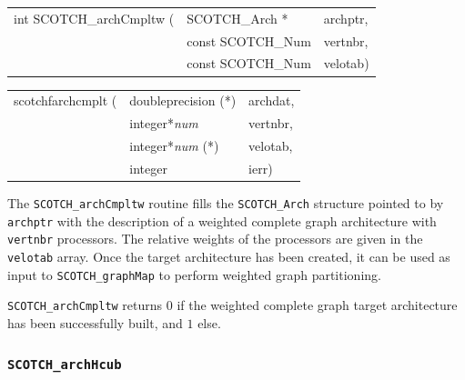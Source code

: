 \begin{itemize}
\progsyn

{\tt\begin{tabular}{l@{}ll}
int SCOTCH\_archCmpltw ( & SCOTCH\_Arch *    & archptr, \\
                         & const SCOTCH\_Num & vertnbr, \\
                         & const SCOTCH\_Num & velotab)
\end{tabular}}

{\tt\begin{tabular}{l@{}ll}
scotchfarchcmplt ( & doubleprecision (*)   & archdat, \\
                   & integer*{\it num}     & vertnbr, \\
                   & integer*{\it num} (*) & velotab, \\
                   & integer               & ierr)
\end{tabular}}

\progdes

The {\tt SCOTCH\_archCmpltw} routine fills the {\tt SCOTCH\_\lbt Arch}
structure pointed to by {\tt archptr} with the description of a
weighted complete graph architecture with {\tt vertnbr} processors.
The relative weights of the processors are given in the {\tt velotab}
array. Once the target architecture has been created, it can be
used as input to {\tt SCOTCH\_\lbt graph\lbt Map} to perform weighted
graph partitioning.

\progret

{\tt SCOTCH\_archCmpltw} returns $0$ if the weighted complete graph target
architecture has been successfully built, and $1$ else.
\end{itemize}

\subsubsection{{\tt SCOTCH\_archHcub}}

